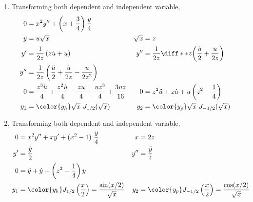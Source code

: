 \begin{enumerate}
    \item Transforming both dependent and independent variable,
          \begin{align}
              0               & = x^2y'' + \left( x + \frac{3}{4} \right) \frac{y}{4}   \\
              y               & = u\sqrt{x}                                           &
              \sqrt{x}        & = z                                                     \\
              y'              & = \frac{1}{2z} \left( z\dot{u} + u \right)            &
              y''             & = \frac{1}{2z} \diff**{z}{\left( \frac{\dot{u}}{2}
              + \frac{u}{2z} \right)}                                                   \\
              y''             & = \frac{1}{2z} \left( \frac{\ddot{u}}{2}
              + \frac{\dot{u}} {2z} - \frac{u}{2z^2} \right)                            \\
              0               & = \frac{z^3\ddot{u}}{4} + \frac{z^2\dot{u}}{4}
              -\frac{zu}{4} + \frac{uz^3}{4}
              +\frac{3uz}{16} &
              0               & = z^2\ddot{u} + z\dot{u}
              + u \left( z^2 - \frac{1}{4} \right)                                      \\
              y_1             & = \color{y_h} \sqrt{x}\ J_{1/2}(\sqrt{x})             &
              y_2             & = \color{y_p} \sqrt{x}\ J_{-1/2}(\sqrt{x})
          \end{align}

    \item Transforming both dependent and independent variable,
          \begin{align}
              0          & = x^2y'' + xy' + (x^2 - 1)\ \frac{y}{4}          &
              x          & = 2z                                               \\
              y'         & = \frac{\dot{y}}{2}                              &
              y''        & = \frac{\ddot{y}}{4}                               \\
              0          & = \ddot{y} + \dot{y} + \left( z^2
              - \frac{1}{4} \right) y                                         \\
              y_1        & = \color{y_h} J_{1/2}\left( \frac{x}{2} \right)
              = \frac{\sin(x/2)}
              {\sqrt{x}} &
              y_2        & = \color{y_p} J_{-1/2}\left( \frac{x}{2} \right)
              = \frac{\cos(x/2)}{\sqrt{x}}
          \end{align}


\end{enumerate}

